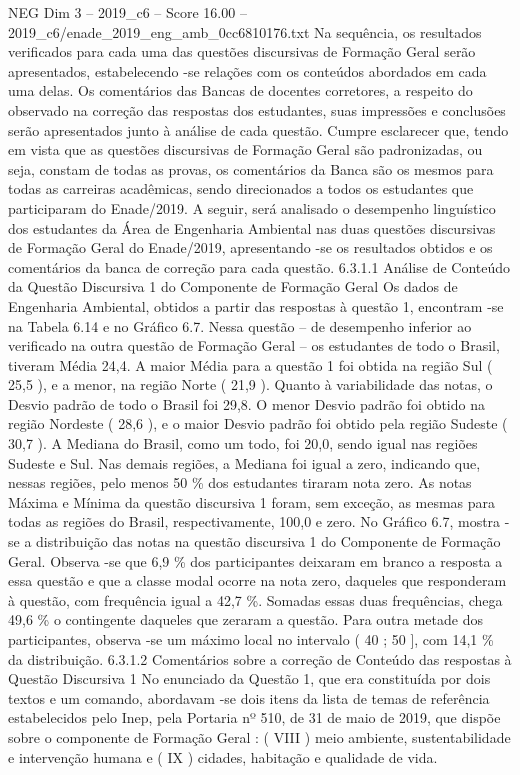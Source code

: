 \begin{textsample}{NEG Dim 3 – 2019\_c6 – Score 16.00 – 2019\_c6/enade\_2019\_eng\_amb\_0cc6810176.txt}
Na sequência, os resultados verificados para cada uma das questões discursivas de Formação Geral serão apresentados, estabelecendo -se relações com os conteúdos abordados em cada uma delas.
Os comentários das Bancas de docentes corretores, a respeito do observado na correção das respostas dos estudantes, suas impressões e conclusões serão apresentados junto à análise de cada questão.
Cumpre esclarecer que, tendo em vista que as questões discursivas de Formação Geral são padronizadas, ou seja, constam de todas as provas, os comentários da Banca são os mesmos para todas as carreiras acadêmicas, sendo direcionados a todos os estudantes que participaram do Enade/2019.
A seguir, será analisado o desempenho linguístico dos estudantes da Área de Engenharia Ambiental nas duas questões discursivas de Formação Geral do Enade/2019, apresentando -se os resultados obtidos e os comentários da banca de correção para cada questão. 6.3.1.1 Análise de Conteúdo da Questão Discursiva 1 do Componente de Formação Geral Os dados de Engenharia Ambiental, obtidos a partir das respostas à questão 1, encontram -se na Tabela 6.14 e no Gráfico 6.7.
Nessa questão – de desempenho inferior ao verificado na outra questão de Formação Geral – os estudantes de todo o Brasil, tiveram Média 24,4.
A maior Média para a questão 1 foi obtida na região Sul ( 25,5 ), e a menor, na região Norte ( 21,9 ).
Quanto à variabilidade das notas, o Desvio padrão de todo o Brasil foi 29,8.
O menor Desvio padrão foi obtido na região Nordeste ( 28,6 ), e o maior Desvio padrão foi obtido pela região Sudeste ( 30,7 ).
A Mediana do Brasil, como um todo, foi 20,0, sendo igual nas regiões Sudeste e Sul.
Nas demais regiões, a Mediana foi igual a zero, indicando que, nessas regiões, pelo menos 50 \% dos estudantes tiraram nota zero.
As notas Máxima e Mínima da questão discursiva 1 foram, sem exceção, as mesmas para todas as regiões do Brasil, respectivamente, 100,0 e zero.
No Gráfico 6.7, mostra -se a distribuição das notas na questão discursiva 1 do Componente de Formação Geral.
Observa -se que 6,9 \% dos participantes deixaram em branco a resposta a essa questão e que a classe modal ocorre na nota zero, daqueles que responderam à questão, com frequência igual a 42,7 \%.
Somadas essas duas frequências, chega 49,6 \% o contingente daqueles que zeraram a questão.
Para outra metade dos participantes, observa -se um máximo local no intervalo ( 40 ; 50 ], com 14,1 \% da distribuição. 6.3.1.2 Comentários sobre a correção de Conteúdo das respostas à Questão Discursiva 1 No enunciado da Questão 1, que era constituída por dois textos e um comando, abordavam -se dois itens da lista de temas de referência estabelecidos pelo Inep, pela Portaria nº 510, de 31 de maio de 2019, que dispõe sobre o componente de Formação Geral : ( VIII ) meio ambiente, sustentabilidade e intervenção humana e ( IX ) cidades, habitação e qualidade de vida.

\end{textsample}
